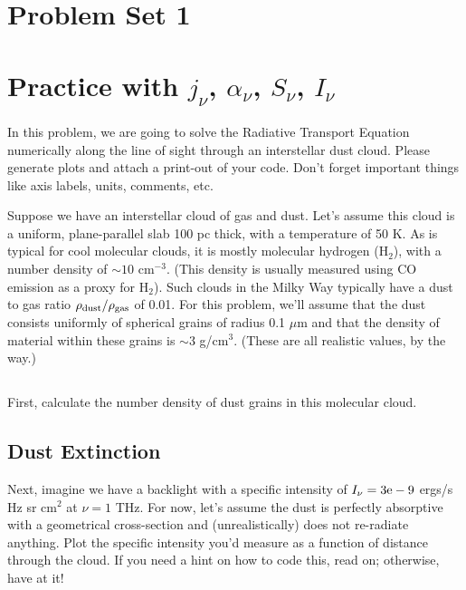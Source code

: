 \documentclass[11pt]{article}
\def\e{{\rm e}}
\begin{document}
\pagestyle{empty}
\parindent=0pt

\section*{\centering Problem Set 1}

\section{Practice with $j_\nu$, $\alpha_\nu$, $S_\nu$, $I_\nu$}

In this problem, we are going to solve the Radiative Transport Equation numerically along the line of
sight through an interstellar dust cloud.  Please generate plots and attach a print-out of your code.
Don't forget important things like axis labels, units, comments, etc.

Suppose we have an interstellar cloud of gas and dust.  Let's assume this
cloud is a uniform, plane-parallel slab 100 pc thick, with a temperature of 50 K.  As
is typical for cool molecular clouds, it is mostly molecular hydrogen (H$_2$), with a number density
of $\sim 10$ cm$^{-3}$. (This density is usually measured using CO emission as a proxy for H$_2$).  
Such clouds in the Milky Way typically have a dust to gas
ratio $\rho_{\rm dust}/\rho_{\rm gas}$ of 0.01.  For this problem, we'll assume that the dust consists
uniformly of spherical grains of radius 0.1 $\mu$m and that the density of material within these
grains is $\sim$3 g/cm$^3$.  (These are all realistic values, by the way.)

\subsection{}

First, calculate the number density of dust grains in this molecular cloud.

\subsection{Dust Extinction}

Next, imagine we have a backlight with a specific intensity of $I_\nu=3\e-9$ ergs/s Hz sr cm$^2$ at $\nu=1$ THz.
For now, let's assume the dust is perfectly absorptive with a geometrical cross-section and 
(unrealistically) does not re-radiate anything.  Plot
the specific intensity you'd measure as a function of distance through the cloud.  
If you need a hint on how to code this, read on; otherwise, have at it!
\end{document}
